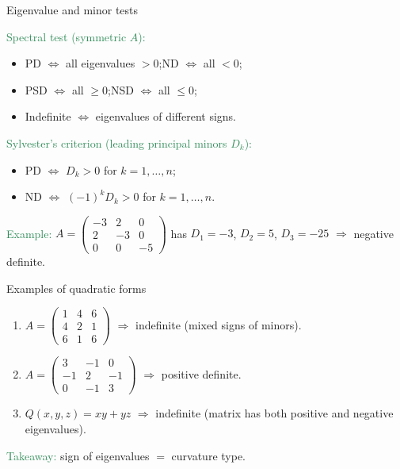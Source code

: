 \documentclass{beamer}
\begin{document}
\begin{frame}{Eigenvalue and minor tests}
 
\textcolor{SeaGreen}{Spectral test (symmetric $A$):}
\begin{itemize}
\item PD $\Longleftrightarrow$ all eigenvalues $>0$;\quad ND $\Longleftrightarrow$ all $<0$;
\item PSD $\Longleftrightarrow$ all $\ge 0$;\quad NSD $\Longleftrightarrow$ all $\le 0$;
\item Indefinite $\Longleftrightarrow$ eigenvalues of different signs.
\end{itemize}
\textcolor{SeaGreen}{Sylvester’s criterion (leading principal minors $D_k$):}
\begin{itemize}
\item PD $\Longleftrightarrow$ $D_k>0$ for $k=1,\ldots,n$;
\item ND $\Longleftrightarrow$ $(-1)^kD_k>0$ for $k=1,\ldots,n$.
\end{itemize}
\textcolor{SeaGreen}{Example:}
\(
A=\begin{pmatrix}-3&2&0\\ 2&-3&0\\ 0&0&-5\end{pmatrix}
\)
has $D_1=-3$, $D_2=5$, $D_3=-25$ $\Rightarrow$ negative definite.
 
\end{frame}




\begin{frame}{Examples of quadratic forms}
\begin{enumerate}
\item
$
A=\begin{pmatrix}1&4&6\\ 4&2&1\\ 6&1&6\end{pmatrix}
$  
$\Rightarrow$ indefinite (mixed signs of minors).

\item
$
A=\begin{pmatrix}3&-1&0\\ -1&2&-1\\ 0&-1&3\end{pmatrix}
$  
$\Rightarrow$ positive definite.

\item
$Q(x,y,z)=xy+yz$  
$\Rightarrow$ indefinite (matrix has both positive and negative eigenvalues).
\end{enumerate}

\medskip
\textcolor{SeaGreen}{Takeaway:} sign of eigenvalues $=$ curvature type.
\end{frame}
\end{document}
